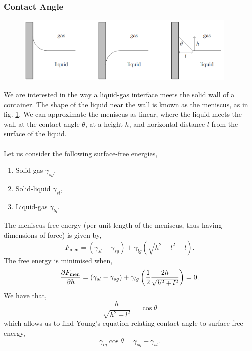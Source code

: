 \documentclass{book}
\begin{document}
\subsubsection{Contact Angle}
\begin{figure}
	\centering
	\includegraphics[width=400px]{contactangle.png}
	\caption{}\label{fig:contactangle}
\end{figure}
We are interested in the way a liquid-gas interface meets the solid wall of a container. The shape of the liquid near the wall is known as the meniscus, as in fig. \ref{fig:contactangle}. We can approximate the meniscus as linear, where the liquid meets the wall at the contact angle $\theta$, at a height $h$, and horizontal distance $l$ from the surface of the liquid.
\\\\
Let us consider the following surface-free energies,
\begin{enumerate}
	\item Solid-gas $\gamma_{sg}$,
	\item Solid-liquid $\gamma_{sl}$,
	\item Liquid-gas $\gamma_{lg}$.
\end{enumerate}
The meniscus free energy (per unit length of the meniscus, thus having dimensions of force) is given by,
\begin{equation}
	F_{\text{men}} = \left(\gamma_{sl} - \gamma_{sg}\right) + \gamma_{lg}\left(\sqrt{h^2 + l^2} - l\right).
\end{equation}
The free energy is minimised when,
\begin{equation}
	\pdv{F_{\text{men}}}{h} = \left(\gamma_{sl} - \gamma_{sg}\right) + \gamma_{lg}\left(\frac{1}{2}\frac{2h}{\sqrt{h^2 + l^2}}\right) = 0.
\end{equation}
We have that, 
\begin{equation}
	\frac{h}{\sqrt{h^2 + l^2}} = \cos\theta 
\end{equation}
which allows us to find Young's equation relating contact angle to surface free energy,
\begin{equation}
	\boxed{\gamma_{lg}\cos\theta = \gamma_{sg}-\gamma_{sl}}.
\end{equation}
\end{document}
